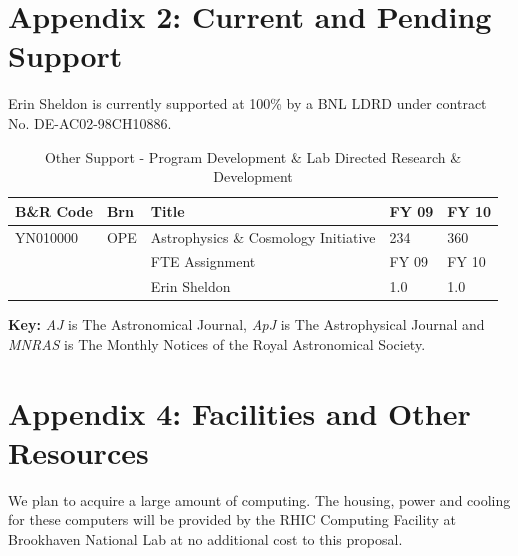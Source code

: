 \documentclass[12pt]{article}
\begin{document}
\newpage
{}
\section*{Appendix 2: Current and Pending Support}

Erin Sheldon is currently supported at 100\% by a BNL LDRD under contract No.
DE-AC02-98CH10886.

\begin{table}[h]
\begin{center}
\begin{tabular}{ |l | l | l | l | l |}
\hline
B\&R Code & Brn & Title & FY 09 & FY 10 \\
\hline
YN010000       & OPE & Astrophysics \& Cosmology Initiative & 234 & 360 \\[4ex]
\hline
               &     & FTE Assignment                       & FY 09 & FY 10 \\
\hline
               &     & Erin Sheldon                         & 1.0   & 1.0 \\
\hline
\end{tabular}
\caption{Other Support - Program Development \& Lab Directed Research \& Development \label{table:support}}
\end{center}
\end{table}




\newpage
{}
\renewcommand{\refname}{\section*{Appendix 3: Bibliography for Narrative}\label{app:bib}}


\vspace{5mm}
\noindent
{\bf Key:} {\it AJ} is The Astronomical Journal, {\it ApJ} is The 
Astrophysical Journal and {\it MNRAS} is The Monthly Notices of the Royal
Astronomical Society.






\newpage
{}
\section*{Appendix 4: Facilities and Other Resources}

We plan to acquire a large amount of computing.  The housing, power and cooling
for these computers will be provided by the RHIC Computing Facility at
Brookhaven National Lab at no additional cost to this proposal.		
\end{document}
